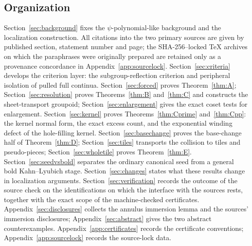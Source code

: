 \documentclass[11pt,reqno]{amsart}
\theoremstyle{definition}
\theoremstyle{remark}
\begin{document}
\subsection{Organization}
Section~\ref{sec:background} fixes the $\psi$-polynomial-like
background and the localization construction.  All citations into the
two primary sources are given by published section, statement number
and page; the SHA-256--locked \TeX{} archives on which the paraphrases
were originally prepared are retained only as a provenance concordance
in Appendix~\ref{app:sourcelock}.
Section~\ref{sec:criteria} develops the criterion layer: the
subgroup-reflection criterion and peripheral isolation of pulled full
continua.  Section~\ref{sec:forced} proves
Theorem~\ref{thm:A}; Section~\ref{sec:resolution} proves
Theorems~\ref{thm:B} and~\ref{thm:C} and constructs the sheet-transport
groupoid; Section~\ref{sec:enlargement} gives the exact coset tests for
enlargement.  Section~\ref{sec:kernel} proves
Theorems~\ref{thm:Cprime} and~\ref{thm:Cpp}: the kernel normal form,
the exact excess count, and the exponential winding defect of the
hole-filling kernel.  Section~\ref{sec:basechange} proves the
base-change half
of Theorem~\ref{thm:D}; Section~\ref{sec:tiles} transports the
collision to tiles and pseudo-pieces; Section~\ref{sec:wholetile}
proves Theorem~\ref{thm:E}.  Section~\ref{sec:seedvsbold} separates the
ordinary canonical seed from a general bold Kahn--Lyubich stage.
Section~\ref{sec:changes} states what these results change in
localization arguments.  Section~\ref{sec:verification} records the
outcome of the source check on the identifications on which the
interface with the sources rests, together with the exact scope of the
machine-checked certificates.  Appendix~\ref{sec:disclosures} collects
the annulus immersion lemma and the sources' immersion disclosures;
Appendix~\ref{sec:abstract} gives the
two abstract counterexamples.  Appendix~\ref{app:certificates} records
the certificate conventions; Appendix~\ref{app:sourcelock} records the
source-lock data.
\end{document}
